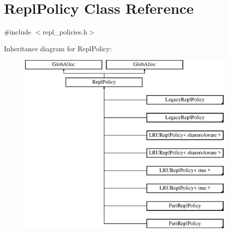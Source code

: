 \hypertarget{classReplPolicy}{\section{Repl\-Policy Class Reference}
\label{classReplPolicy}
}


{\ttfamily \#include $<$repl\-\_\-policies.\-h$>$}

Inheritance diagram for Repl\-Policy\-:\begin{figure}[H]
\begin{center}
\leavevmode
\includegraphics[height=9.017714cm]{classReplPolicy}
\end{center}
\end{figure}
